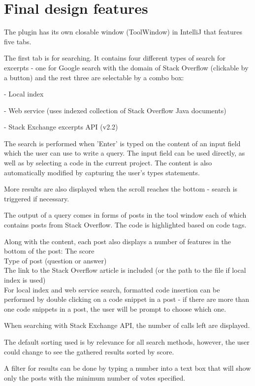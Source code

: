 \documentclass{l4proj}
\begin{document}
\section{Final design features}
The plugin has its own closable window (ToolWindow) in IntelliJ that features five tabs.

The first tab is for searching. It contains four different types of search for excerpts - one for Google search with the domain of Stack Overflow (clickable by a button) and the rest three are selectable by a combo box:

- Local index

- Web service (uses indexed collection of Stack Overflow Java documents)

- Stack Exchange excerpts API (v2.2)

The search is performed when 'Enter' is typed on the content of an input field which the user can use to write a query. The input field can be used directly, as well as by selecting a code in the current project. The content is also automatically modified by capturing the user's types statements.

More results are also displayed when the scroll reaches the bottom - search is triggered if necessary.

The output of a query comes in forms of posts in the tool window each of
which contains posts from Stack Overflow. The code is highlighted based on code tags.

Along with the content, each post also displays a number of features in the bottom of the post:
The score\\
Type of post (question or answer)\\
The link to the Stack Overflow article is included (or the path to the file if local index is used)\\

For local index and web service search, formatted code insertion can be performed by double clicking on a code snippet in a post - if there are more than one code snippets in a post, the user will be prompt to choose which one.

When searching with Stack Exchange API, the number of calls left are displayed.

The default sorting used is by relevance for all search methods, however, the user could change to see the gathered results sorted by score.

A filter for results can be done by typing a number into a text box that will show only the posts with the minimum number of votes specified.
\end{document}
